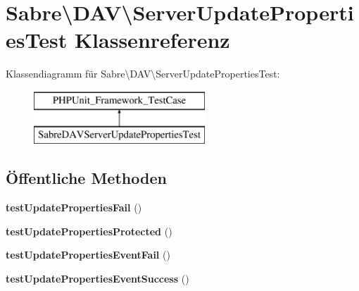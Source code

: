 \hypertarget{class_sabre_1_1_d_a_v_1_1_server_update_properties_test}{}\section{Sabre\textbackslash{}D\+AV\textbackslash{}Server\+Update\+Properties\+Test Klassenreferenz}
\label{class_sabre_1_1_d_a_v_1_1_server_update_properties_test}
Klassendiagramm für Sabre\textbackslash{}D\+AV\textbackslash{}Server\+Update\+Properties\+Test\+:\begin{figure}[H]
\begin{center}
\leavevmode
\includegraphics[height=2.000000cm]{class_sabre_1_1_d_a_v_1_1_server_update_properties_test}
\end{center}
\end{figure}
\subsection*{Öffentliche Methoden}
\begin{DoxyCompactItemize}
\item 
\mbox{\label{class_sabre_1_1_d_a_v_1_1_server_update_properties_test_ad45df51f500fed5387a0e754bb470ee1}} 
{\bfseries test\+Update\+Properties\+Fail} ()
\item 
\mbox{\label{class_sabre_1_1_d_a_v_1_1_server_update_properties_test_a1a18ab07535a3045288c8c962de50ca0}} 
{\bfseries test\+Update\+Properties\+Protected} ()
\item 
\mbox{\label{class_sabre_1_1_d_a_v_1_1_server_update_properties_test_a89437cf370e035d721d7dd3cf240a7db}} 
{\bfseries test\+Update\+Properties\+Event\+Fail} ()
\item 
\mbox{\label{class_sabre_1_1_d_a_v_1_1_server_update_properties_test_ae6680051949ce9f2f9a969d1f8d0de4a}} 
{\bfseries test\+Update\+Properties\+Event\+Success} ()
\end{DoxyCompactItemize}


